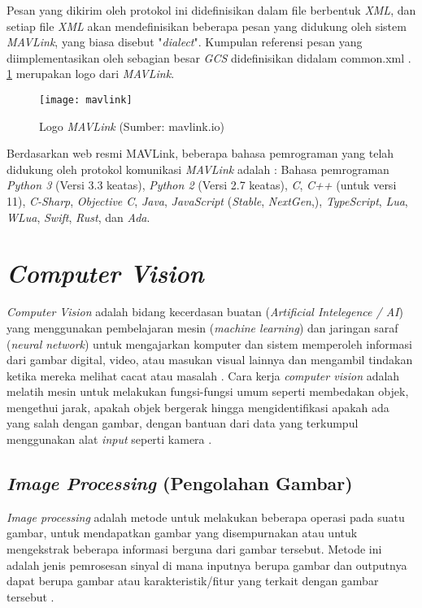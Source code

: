 Pesan yang dikirim oleh protokol ini didefinisikan dalam file berbentuk \textit{XML}, dan setiap file \textit{XML} akan mendefinisikan beberapa pesan yang didukung oleh sistem \textit{MAVLink}, yang biasa disebut "\textit{dialect}". Kumpulan referensi pesan yang diimplementasikan oleh sebagian besar \textit{GCS} didefinisikan didalam common.xml \citep{mavlink}. \cref{fig:mavlink} merupakan logo dari \textit{MAVLink}.

\begin{figure}[H]
	\centering
	\texttt{[image: mavlink]}
	\caption{Logo \textit{MAVLink} (Sumber: mavlink.io)}
	\label{fig:mavlink}
\end{figure}

 Berdasarkan web resmi MAVLink, beberapa bahasa pemrograman yang telah didukung oleh protokol komunikasi \textit{MAVLink} adalah : Bahasa pemrograman \textit{Python 3} (Versi 3.3 keatas), \textit{Python 2} (Versi 2.7 keatas), \textit{C},\textit{ C++} (untuk versi 11), \textit{C-Sharp}, \textit{Objective C}, \textit{Java}, \textit{JavaScript} (\textit{Stable}, \textit{NextGen},), \textit{TypeScript}, \textit{Lua}, \textit{WLua}, \textit{Swift}, \textit{Rust}, dan \textit{Ada}.

\section{\textit{Computer Vision}}
\textit{Computer Vision} adalah bidang kecerdasan buatan (\textit{Artificial Intelegence / AI}) yang menggunakan pembelajaran mesin (\textit{machine learning}) dan jaringan saraf (\textit{neural network}) untuk mengajarkan komputer dan sistem memperoleh informasi dari gambar digital, video, atau masukan visual lainnya dan mengambil tindakan ketika mereka melihat cacat atau masalah \citep{efrian2022image}.
Cara kerja \textit{computer vision} adalah melatih mesin untuk melakukan fungsi-fungsi umum seperti membedakan objek, mengethui jarak, apakah objek bergerak hingga mengidentifikasi apakah ada yang salah dengan gambar, dengan bantuan dari data yang terkumpul menggunakan alat \textit{input} seperti kamera \citep{mustofa2023ai}. 

\subsection{\textit{Image Processing} (Pengolahan Gambar)}
\textit{Image processing} adalah metode untuk melakukan beberapa operasi pada suatu gambar, untuk mendapatkan gambar yang disempurnakan atau untuk mengekstrak beberapa informasi berguna dari gambar tersebut. Metode ini adalah jenis pemrosesan sinyal di mana inputnya berupa gambar dan outputnya dapat berupa gambar atau karakteristik/fitur yang terkait dengan gambar tersebut \citep{nurakbar2022pengenalan}.

